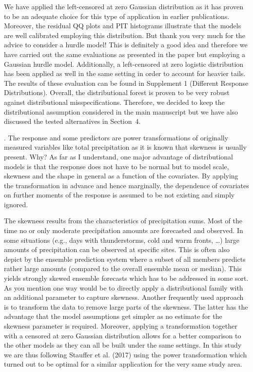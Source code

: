 \documentclass[american,foldmarks=false,noconfig]{uibklttr}
\newenvironment{review}{\fontshape{\itdefault}\fontseries{\bfdefault} \selectfont \smallskip}{\par}
\begin{document}
We have applied the left-censored at zero Gaussian distribution
as it has proven to be an adequate choice for this type of 
application in earlier publications.
Moreover, the residual QQ plots and PIT histograms illustrate
that the models are well calibrated employing this distribution.
But thank you very much for the advice to consider a hurdle model!
This is definitely a good idea and therefore we have carried out the
same evaluations as presented in the paper but employing a
Gaussian hurdle model. Additionally, a left-censored at zero logistic
distribution has been applied as well in the same setting in
order to account for heavier tails. The results of these evaluation
can be found in Supplement 1 (Different Response Distributions). 
Overall, the distributional forest is proven to be very robust against 
distributional misspecifications. Therefore, we decided to keep the 
distributional assumption considered in the main manuscript but we have 
also discussed the tested alternatives in Section~4.


\begin{review}
2. The response and some predictors are power transformations 
of originally measured variables like total precipitation as 
it is known that skewness is usually present. Why? As far as I 
understand, one major advantage of distributional models is
that the response does not have to be normal but to model scale, 
skewness and the shape in general as a function of the covariates. 
By applying the transformation in advance and hence marginally, 
the dependence of covariates on further moments of the response 
is assumed to be not existing and simply ignored.
\end{review}

The skewness results from the characteristics of precipitation sums. 
Most of the time no or only moderate precipitation amounts are forecasted 
and observed. In some situations (e.g., days with thunderstorms, cold and 
warm fronts, \dots) large amounts of precipitation can be observed at 
specific sites. This is often also depict by the ensemble prediction 
system where a subset of all members predicts rather large amounts 
(compared to the overall ensemble mean or median). This yields strongly 
skewed ensemble forecasts which has to be addressed in some sort.\\
As you mention one way would be to directly apply a
distributional family with an additional parameter to capture
skewness. Another frequently used approach is to transform the 
data to remove large parts of the skewness. The latter has the 
advantage that the model assumptions get simpler as no estimate 
for the skewness parameter is required. 
Moreover, applying a transformation together with a censored 
at zero Gaussian distribution allows for a better comparison 
to the other models as they can all be built under the same 
settings.
In this study we are thus following Stauffer et al. (2017) 
using the power transformation which turned out to be optimal 
for a similar application for the very same study area.
\end{document}
